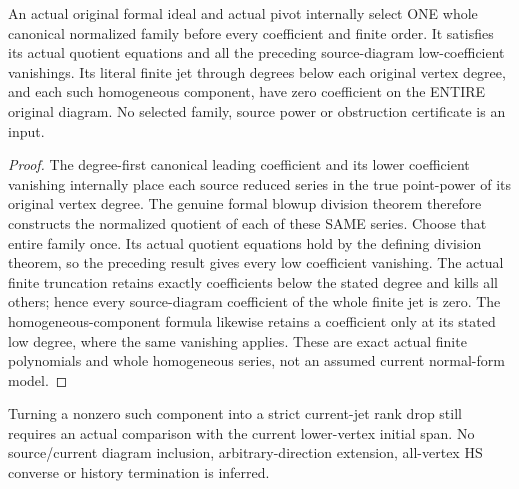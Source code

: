 \begin{theorem}
\label{hir:actual-canonical-zero-point-low-jet-normality-producer}
\leanok
An actual original formal ideal and actual pivot internally select ONE
whole canonical normalized family before every coefficient and finite
order. It satisfies its actual quotient equations and all the preceding
source-diagram low-coefficient vanishings. Its literal finite jet
through degrees below each original vertex degree, and each such
homogeneous component, have zero coefficient on the ENTIRE original
diagram. No selected family, source power or obstruction certificate
is an input.
\end{theorem}
\begin{proof}
The degree-first canonical leading coefficient and its lower coefficient
vanishing internally place each source reduced series in the true
point-power of its original vertex degree. The genuine formal blowup
division theorem therefore constructs the normalized quotient of each
of these SAME series. Choose that entire family once. Its actual
quotient equations hold by the defining division theorem, so the
preceding result gives every low coefficient vanishing. The actual
finite truncation retains exactly coefficients below the stated degree
and kills all others; hence every source-diagram coefficient of the
whole finite jet is zero. The homogeneous-component formula likewise
retains a coefficient only at its stated low degree, where the same
vanishing applies. These are exact actual finite polynomials and
whole homogeneous series, not an assumed current normal-form model.
\end{proof}

Turning a nonzero such component into a strict current-jet rank drop
still requires an actual comparison with the current lower-vertex
initial span. No source/current diagram inclusion, arbitrary-direction
extension, all-vertex HS converse or history termination is inferred.
